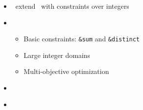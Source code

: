 \begin{frame}{\clingcon}
  \begin{itemize}
  \item {} \ extend \clingo\ with constraints over integers
  \item {} \
    \begin{itemize}
    \item Basic constraints: \lstinline{&sum} and \lstinline{&distinct}
    \item Large integer domains
    \item Multi-objective optimization
    \end{itemize}
  \item {} \ \cite{bakaossc16a}
  \item {} \ \cite{?}
  \end{itemize}
\end{frame}
%
